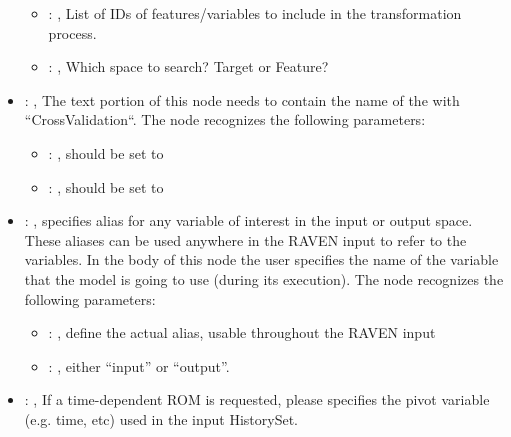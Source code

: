 \begin{itemize}
\begin{itemize}
        \item {}: ,
          List of IDs of features/variables to include in the transformation process.

        \item {}: ,
          Which space to search? Target or Feature?
      \end{itemize}

    \item {}: ,
      The text portion of this node needs to contain the name of the  with
               ``CrossValidation``.
      The  node recognizes the following parameters:
        \begin{itemize}
          \item {}: ,
            should be set to 
          \item {}: ,
            should be set to 
      \end{itemize}

    \item {}: ,
      specifies alias for         any variable of interest in the input or output space. These
      aliases can be used anywhere in the RAVEN input to         refer to the variables. In the body
      of this node the user specifies the name of the variable that the model is going to use
      (during its execution).
      The  node recognizes the following parameters:
        \begin{itemize}
          \item {}: ,
            define the actual alias, usable throughout the RAVEN input
          \item {}: ,
            either ``input'' or ``output''.
      \end{itemize}

    \item {}: ,
      If a time-dependent ROM is requested, please specifies the pivot         variable (e.g. time,
      etc) used in the input HistorySet.


\end{itemize}
